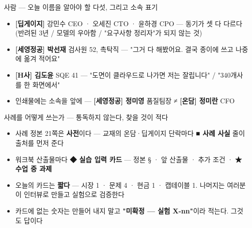 \begin{frame}{사람 — 오늘 이름을 알아야 할 다섯, 그리고 소속 표기}
\begin{itemize}
\item \textbf{[딥게이지]} 강민수 CEO · 오세진 CTO · 윤하경 CPO — 동기가 셋 다 다르다(반려된 3년 / 모델의 우아함 / "요구사항 정리자"가 되지 않는 것)
\item \textbf{[세영정공] 박선재} 검사원 52, 촉탁직 — "그거 다 해봤어요. 결국 종이에 쓰고 나중에 옮겨 적어요"
\item \textbf{[H사] 김도윤} SQE 41 — "도면이 클라우드로 나가면 저는 잘립니다" / "340개사를 한 화면에서"
\item 인쇄물에는 소속을 앞에 — \textbf{[세영정공] 정미영} 품질팀장 ≠ \textbf{[온담] 정미란} CFO
\end{itemize}
\end{frame}

\begin{frame}{사례를 어떻게 쓰는가 — 통독하지 않는다, 찾을 것이 적다}
\begin{itemize}
\item 사례 정본 21쪽은 \textbf{사전}이다 — 교재의 온담·딥게이지 단락마다 \textbf{■ 사례 사실} 줄이 출처를 먼저 준다
\item 워크북 산출물마다 \textbf{◆ 실습 입력 카드} — 정본 § · 앞 산출물 · 추가 조건 · \textbf{★ 수업 중 과제}
\item 오늘의 카드는 \textbf{짧다} — 시장 1 · 문제 4 · 현금 1 · 캡테이블 1. 나머지는 여러분이 인터뷰로 만들고 실험으로 검증한다
\item 카드에 없는 숫자는 만들어 내지 말고 \textbf{"미확정 — 실험 X-nn"}이라 적는다. 그것도 답이다
\end{itemize}
\end{frame}

